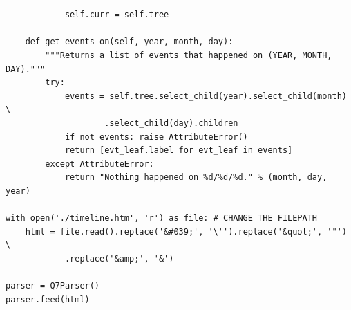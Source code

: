 \documentclass[11pt]{article}
\begin{document}
\begin{lstlisting}
            ____________________________________________________________
            self.curr = self.tree
    
    def get_events_on(self, year, month, day):
        """Returns a list of events that happened on (YEAR, MONTH, DAY)."""
        try:
            events = self.tree.select_child(year).select_child(month) \
                    .select_child(day).children
            if not events: raise AttributeError()
            return [evt_leaf.label for evt_leaf in events]
        except AttributeError:
            return "Nothing happened on %d/%d/%d." % (month, day, year)
            
with open('./timeline.htm', 'r') as file: # CHANGE THE FILEPATH
    html = file.read().replace('&#039;', '\'').replace('&quot;', '"') \
            .replace('&amp;', '&')

parser = Q7Parser()
parser.feed(html)
\end{lstlisting}
\end{document}
